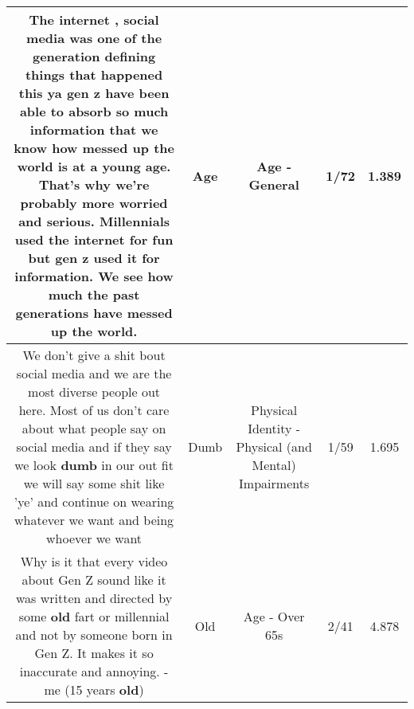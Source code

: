 \documentclass[11pt]{article}
\newlength\mylength
\begin{document}
\begin{center}
\begin{longtable}{|C{.65\mylength}|C{.30\mylength}|C{.12\mylength}|C{.12\mylength}|C{.12\mylength}|}
  \small The internet , social media was one of the generation defining things that happened this ya gen z have been able to absorb so much information that we know how messed up the world is at a young \textbf{age}. That's why we're probably more worried and serious. Millennials used the internet for fun but gen z used it for information. We see how much the past generations have messed up the world.\normalsize   & Age & Age - General & 1/72 & 1.389 \\  \hline
  \small We don't give a shit bout social media and we are the most diverse people out here. Most of us don't care about what people say on social media and if they say we look \textbf{dumb} in our out fit we will say some shit like 'ye' and continue on wearing whatever we want and being whoever we want\normalsize   & Dumb & Physical Identity - Physical (and Mental) Impairments & 1/59 & 1.695 \\  \hline
  \small Why is it that every video about Gen Z sound like it was written and directed by some \textbf{old} fart or millennial and not by someone born in Gen Z. It makes it so inaccurate and annoying. -me (15 years \textbf{old})\normalsize   & Old & Age - Over 65s & 2/41 & 4.878 \\  \hline

\end{longtable}
\end{center}
\end{document}
